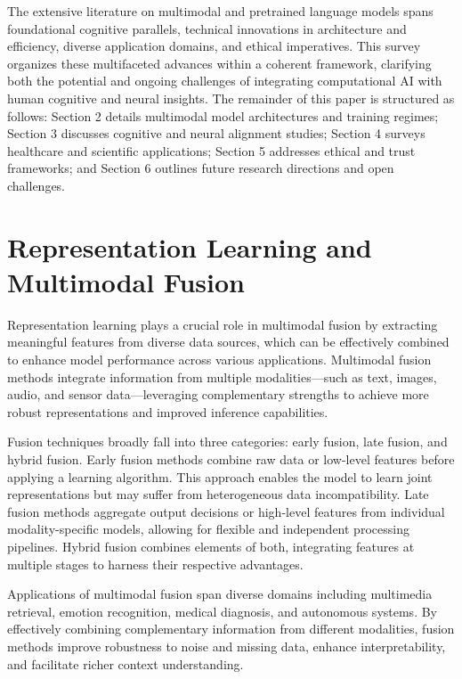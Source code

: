 \documentclass[sigconf]{acmart}
\begin{document}
The extensive literature on multimodal and pretrained language models spans foundational cognitive parallels, technical innovations in architecture and efficiency, diverse application domains, and ethical imperatives. This survey organizes these multifaceted advances within a coherent framework, clarifying both the potential and ongoing challenges of integrating computational AI with human cognitive and neural insights. The remainder of this paper is structured as follows: Section 2 details multimodal model architectures and training regimes; Section 3 discusses cognitive and neural alignment studies; Section 4 surveys healthcare and scientific applications; Section 5 addresses ethical and trust frameworks; and Section 6 outlines future research directions and open challenges.

\section{Representation Learning and Multimodal Fusion}

Representation learning plays a crucial role in multimodal fusion by extracting meaningful features from diverse data sources, which can be effectively combined to enhance model performance across various applications. Multimodal fusion methods integrate information from multiple modalities—such as text, images, audio, and sensor data—leveraging complementary strengths to achieve more robust representations and improved inference capabilities.

Fusion techniques broadly fall into three categories: early fusion, late fusion, and hybrid fusion. Early fusion methods combine raw data or low-level features before applying a learning algorithm. This approach enables the model to learn joint representations but may suffer from heterogeneous data incompatibility. Late fusion methods aggregate output decisions or high-level features from individual modality-specific models, allowing for flexible and independent processing pipelines. Hybrid fusion combines elements of both, integrating features at multiple stages to harness their respective advantages.

Applications of multimodal fusion span diverse domains including multimedia retrieval, emotion recognition, medical diagnosis, and autonomous systems. By effectively combining complementary information from different modalities, fusion methods improve robustness to noise and missing data, enhance interpretability, and facilitate richer context understanding.
\end{document}
